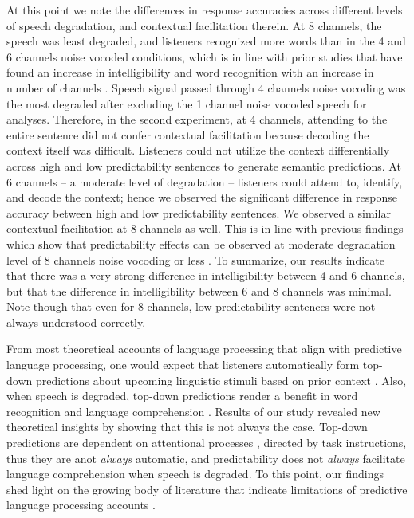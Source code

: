 \documentclass[a4paper, nobind]{templates/ociamthesis}
\begin{document}
At this point we note the differences in response accuracies across different levels of speech degradation, and contextual facilitation therein.
At 8 channels, the speech was least degraded, and listeners recognized more words than in the 4 and 6 channels noise vocoded conditions, which is in line with prior studies that have found an increase in intelligibility and word recognition with an increase in number of channels \autocite{Davis2005,Obleser2011}.
Speech signal passed through 4 channels noise vocoding was the most degraded after excluding the 1 channel noise vocoded speech for analyses.
Therefore, in the second experiment, at 4 channels, attending to the entire sentence did not confer contextual facilitation because decoding the context itself was difficult.
Listeners could not utilize the context differentially across high and low predictability sentences to generate semantic predictions.
At 6 channels -- a moderate level of degradation -- listeners could attend to, identify, and decode the context; hence we observed the significant difference in response accuracy between high and low predictability sentences.
We observed a similar contextual facilitation at 8 channels as well.
This is in line with previous findings which show that predictability effects can be observed at moderate degradation level of 8 channels noise vocoding or less \autocites[e.g.,][]{Obleser2007}[cf.][]{Obleser2010}.
To summarize, our results indicate that there was a very strong difference in intelligibility between 4 and 6 channels, but that the difference in intelligibility between 6 and 8 channels was minimal.
Note though that even for 8 channels, low predictability sentences were not always understood correctly.

From most theoretical accounts of language processing that align with predictive language processing, one would expect that listeners automatically form top-down predictions about upcoming linguistic stimuli based on prior context \autocite{Friston2020,Kuperberg2016,Mcclelland1986,Norris2016,Pickering2018}.
Also, when speech is degraded, top-down predictions render a benefit in word recognition and language comprehension \autocites[e.g.,][]{Corps2020,Sheldon2008a,Sheldon2008b}.
Results of our study revealed new theoretical insights by showing that this is not always the case.
Top-down predictions are dependent on attentional processes \autocite[see also,][]{Kok2011}, directed by task instructions, thus they are anot \emph{always} automatic, and predictability does not \emph{always} facilitate language comprehension when speech is degraded.
To this point, our findings shed light on the growing body of literature that indicate limitations of predictive language processing accounts \autocite{Heuttig2019,Huettig2016,Mishra2012,Nieuwland2018}.
\end{document}
